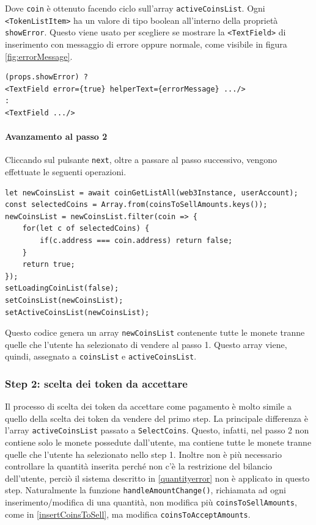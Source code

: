 \documentclass[a4paper]{article}
\begin{document}
        Dove \verb|coin| è ottenuto facendo ciclo sull'array \verb|activeCoinsList|.
        \newline
        Ogni \verb|<TokenListItem>| ha un valore di tipo boolean all'interno della proprietà \verb|showError|. Questo viene usato per scegliere se mostrare la \verb|<TextField>| di inserimento con messaggio di errore oppure normale, come visibile in figura \ref{fig:errorMessage}.
\begin{lstlisting}[style=ES6, title={Scelta di TextField da mostrare}]
(props.showError) ?
<TextField error={true} helperText={errorMessage} .../>
:
<TextField .../>\end{lstlisting}
        \paragraph{Avanzamento al passo 2}
        Cliccando sul pulsante \verb|next|, oltre a passare al passo successivo, vengono effettuate le seguenti operazioni.
\begin{lstlisting}[style=ES6, title={Codice eseguito passando al passo 2}]
let newCoinsList = await coinGetListAll(web3Instance, userAccount);
const selectedCoins = Array.from(coinsToSellAmounts.keys());
newCoinsList = newCoinsList.filter(coin => {
    for(let c of selectedCoins) {
        if(c.address === coin.address) return false;
    }
    return true;
});
setLoadingCoinList(false);
setCoinsList(newCoinsList);
setActiveCoinsList(newCoinsList);\end{lstlisting}
        Questo codice genera un array \verb|newCoinsList| contenente tutte le monete tranne quelle che l'utente ha selezionato di vendere al passo 1. Questo array viene, quindi, assegnato a \verb|coinsList| e \verb|activeCoinsList|.

        \subsubsection{Step 2: scelta dei token da accettare}
        Il processo di scelta dei token da accettare come pagamento è molto simile a quello della scelta dei token da vendere del primo step. La principale differenza è l'array \verb|activeCoinsList| passato a \verb|SelectCoins|.
        Questo, infatti, nel passo 2 non contiene solo le monete possedute dall'utente, ma contiene tutte le monete tranne quelle che l'utente ha selezionato nello step 1.
        \newline
        Inoltre non è più necessario controllare la quantità inserita perché non c'è la restrizione del bilancio dell'utente, perciò il sistema descritto in \ref{quantityerror} non è applicato in questo step.
        Naturalmente la funzione \verb|handleAmountChange()|, richiamata ad ogni inserimento/modifica di una quantità, non modifica più \verb|coinsToSellAmounts|, come in \ref{insertCoinsToSell}, ma modifica \verb|coinsToAcceptAmounts|.
\end{document}
